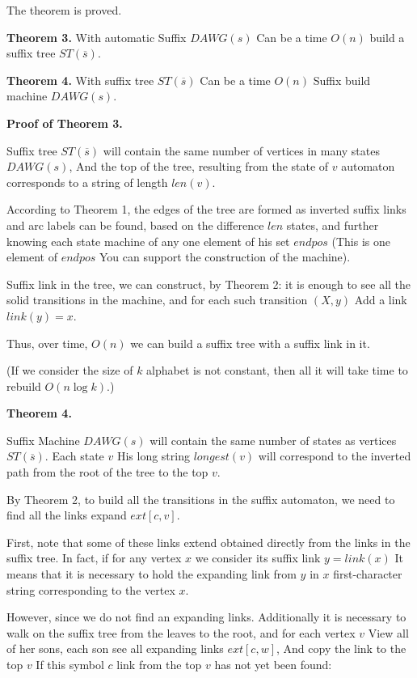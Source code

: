 The theorem is proved.

\textbf{Theorem 3.} With automatic Suffix $DAWG (s)$ Can be a time $O (n)$ build a suffix tree $ST (\overline {s})$.

\textbf{Theorem 4.} With suffix tree $ST (\overline {s})$ Can be a time $O (n)$ Suffix build machine $DAWG (s)$.

\textbf{Proof of Theorem 3.}

Suffix tree $ST (\overline {s})$ will contain the same number of vertices in many states $DAWG (s)$, And the top of the tree, resulting from the state of $v$ automaton corresponds to a string of length $len (v)$.

According to Theorem 1, the edges of the tree are formed as inverted suffix links and arc labels can be found, based on the difference $len$ states, and further knowing each state machine of any one element of his set $endpos$ (This is one element of $endpos$ You can support the construction of the machine).

Suffix link in the tree, we can construct, by Theorem 2: it is enough to see all the solid transitions in the machine, and for each such transition $(X, y)$ Add a link $link (y) = x$.

Thus, over time, $O (n)$ we can build a suffix tree with a suffix link in it.

(If we consider the size of $k$ alphabet is not constant, then all it will take time to rebuild $O (n \log k)$.)

\textbf{Theorem 4.}

Suffix Machine $DAWG (s)$ will contain the same number of states as vertices $ST (\overline {s})$. Each state $v$ His long string $longest (v)$ will correspond to the inverted path from the root of the tree to the top $v$.

By Theorem 2, to build all the transitions in the suffix automaton, we need to find all the links expand $ext [c, v]$.

First, note that some of these links extend obtained directly from the links in the suffix tree. In fact, if for any vertex $x$ we consider its suffix link $y = link (x)$ It means that it is necessary to hold the expanding link from $y$ in $x$ first-character string corresponding to the vertex $x$.

However, since we do not find an expanding links. Additionally it is necessary to walk on the suffix tree from the leaves to the root, and for each vertex $v$ View all of her sons, each son see all expanding links $ext [c, w]$, And copy the link to the top $v$ If this symbol $c$ link from the top $v$ has not yet been found:

